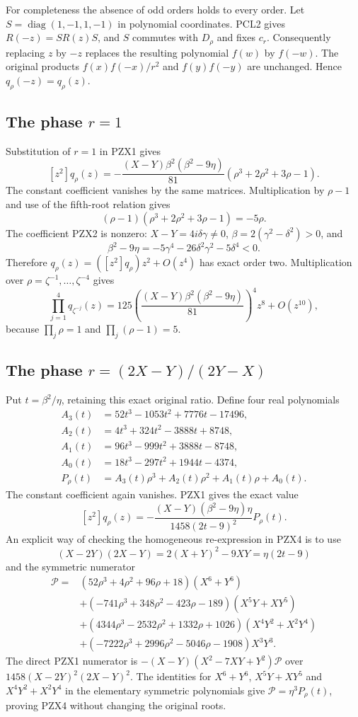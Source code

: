 For completeness the absence of odd orders holds to every order.
Let $S=\operatorname{diag}(1,-1,1,-1)$ in polynomial coordinates.
PCL2 gives $R(-z)=SR(z)S$, and $S$ commutes with $D_\rho$ and
fixes $c_r$.  Consequently replacing $z$ by $-z$ replaces the
resulting polynomial $f(w)$ by $f(-w)$.  The original products
$f(x)f(-x)/r^2$ and $f(y)f(-y)$ are unchanged.  Hence
$q_\rho(-z)=q_\rho(z)$.

\subsection{The phase $r=1$}
Substitution of $r=1$ in PZX1 gives
\[
 [z^2]q_\rho(z)=
 -\frac{(X-Y)\beta^2(\beta^2-9\eta)}{81}
       (\rho^3+2\rho^2+3\rho-1).                    \tag{PZX2}
\]
The constant coefficient vanishes by the same matrices.
Multiplication by $\rho-1$ and use of the fifth-root relation gives
\[
 (\rho-1)(\rho^3+2\rho^2+3\rho-1)=-5\rho.
\]
The coefficient PZX2 is nonzero: $X-Y=4i\delta\gamma\ne0$,
$\beta=2(\gamma^2-\delta^2)>0$, and
\[
 \beta^2-9\eta=-5\gamma^4-26\delta^2\gamma^2-5\delta^4<0.
\]
Therefore $q_\rho(z)=([z^2]q_\rho)z^2+O(z^4)$ has exact order two.
Multiplication over $\rho=\zeta^{-1},\ldots,\zeta^{-4}$ gives
\[
 \prod_{j=1}^4q_{\zeta^{-j}}(z)=
 125\left(\frac{(X-Y)\beta^2(\beta^2-9\eta)}{81}\right)^4
 z^8+O(z^{10}),                                      \tag{PZX3}
\]
because $\prod_j\rho=1$ and $\prod_j(\rho-1)=5$.

\subsection{The phase $r=(2X-Y)/(2Y-X)$}
Put $t=\beta^2/\eta$, retaining this exact original ratio.
Define four real polynomials
\[
\begin{split}
A_3(t)&=52t^3-1053t^2+7776t-17496,\\
A_2(t)&=4t^3+324t^2-3888t+8748,\\
A_1(t)&=96t^3-999t^2+3888t-8748,\\
A_0(t)&=18t^3-297t^2+1944t-4374,\\
P_\rho(t)&=A_3(t)\rho^3+A_2(t)\rho^2+A_1(t)\rho+A_0(t).
\end{split}
\]
The constant coefficient again vanishes.  PZX1 gives the exact value
\[
 [z^2]q_\rho(z)=
 -\frac{(X-Y)(\beta^2-9\eta)\eta}
 {1458(2t-9)^2}P_\rho(t).                           \tag{PZX4}
\]
An explicit way of checking the homogeneous re-expression in PZX4 is
to use
\[
 (X-2Y)(2X-Y)=2(X+Y)^2-9XY=\eta(2t-9)
\]
and the symmetric numerator
\[
\begin{split}
\mathcal P={}&(52\rho^3+4\rho^2+96\rho+18)(X^6+Y^6)\\
&+(-741\rho^3+348\rho^2-423\rho-189)(X^5Y+XY^5)\\
&+(4344\rho^3-2532\rho^2+1332\rho+1026)(X^4Y^2+X^2Y^4)\\
&+(-7222\rho^3+2996\rho^2-5046\rho-1908)X^3Y^3.
\end{split}
\]
The direct PZX1 numerator is
$-(X-Y)(X^2-7XY+Y^2)\mathcal P$ over
$1458(X-2Y)^2(2X-Y)^2$.
The identities for $X^6+Y^6$, $X^5Y+XY^5$ and
$X^4Y^2+X^2Y^4$ in the elementary symmetric polynomials give
$\mathcal P=\eta^3P_\rho(t)$, proving PZX4 without changing the
original roots.

